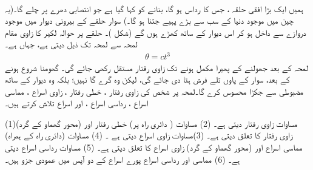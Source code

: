 \\
ہمیں ایک بڑا افقی   حلقہ ، جس کا رداس  ہو گا،  بنانے کو کہا گیا ہے جو انتصابی دھرے پر چلے گا۔(یہ چین میں  موجود دنیا کے سب سے بڑے پہیے جتنا ہو گا۔) سوار حلقے کے  بیرونی  دیوار میں موجود دروازے سے داخل ہو کر اس  دیوار کے ساتھ کھڑے ہوں گے (شکل )۔ حلقے پر حوالہ لکیر کا زاوی مقام   لمحہ  سے لمحہ     تک ذیل دیتی ہے، جہاں  ہے۔
\begin{align}
\theta=ct^3
\end{align}
لمحہ  کے بعد جھولنے  کے پھیرا  مکمل ہونے تک  زاوی رفتار مستقل  رکھی جائے گی۔ گھومنا شروع ہونے کے بعد، سوار کے پاوں تلے فرش ہٹا دی جائے گی، لیکن وہ گرے گا نہیں؛ بلکہ وہ دیوار کے ساتھ مضبوطی سے جکڑا  محسوس کرے گا۔لمحہ  پر شخص  کی زاوی رفتار ، خطی رفتار ، زاوی اسراع ، مماسی اسراع ،  رداسی اسراع ، اور   اسراع  تلاش کرتے ہیں۔

(1)مساوات     زاوی رفتار   دیتی ہے۔ (2) مساوات  (  دائری راہ پر) خطی رفتار   اور (محور گھماو کے گرد)   زاوی رفتار     کا تعلق  دیتی ہے۔ (3)مساوات     زاوی اسراع   دیتی ہے ۔ (4)  مساوات  (دائری راہ کے ہمراہ) مماسی اسراع  اور  (محور گھماو کے گرد) زاوی اسراع  کا تعلق   دیتی ہے۔ (5)  مساوات  رداسی اسراع  دیتی ہے۔  (6)  مماسی اور رداسی اسراع   پورے اسراع  کے دو آپس میں عمودی جزو ہیں۔


